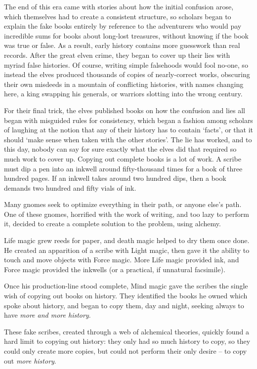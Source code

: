 \begin{multicols}{2}
\begin{exampletext}
    The end of this era came with stories about how the initial confusion arose, which themselves had to create a consistent structure, so scholars began to explain the fake books entirely by reference to the adventurers who would pay incredible sums for books about long-lost treasures, without knowing if the book was true or false.
    As a result, early history contains more guesswork than real records.
  \or
    After the great elven crime, they began to cover up their lies with myriad false histories.
    Of course, writing simple falsehoods would fool no-one, so instead the elves produced thousands of copies of nearly-correct works, obscuring their own misdeeds in a mountain of conflicting histories, with names changing here, a king swapping his generals, or warriors slotting into the wrong century.

    For their final trick, the elves published books on how the confusion and lies all began with misguided rules for consistency, which began a fashion among scholars of laughing at the notion that any of their history has to contain `facts', or that it should `make sense when taken with the other stories'.
    The lie has worked, and to this day, nobody can say for sure exactly what the elves did that required so much work to cover up.
  \or
  Copying out complete books is a lot of work.
  A scribe must dip a pen into an inkwell around fifty-thousand times for a book of three hundred pages.
  If an inkwell takes around two hundred dips, then a book demands two hundred and fifty vials of ink.

  Many gnomes seek to optimize everything in their path, or anyone else's path.
  One of these gnomes, horrified with the work of writing, and too lazy to perform it, decided to create a complete solution to the problem, using alchemy.

  Life magic grew reeds for paper, and death magic helped to dry them once done.
  He created an apparition of a scribe with Light magic, then gave it the ability to touch and move objects with Force magic.
  More Life magic provided ink, and Force magic provided the inkwells (or a practical, if unnatural facsimile).

  Once his production-line stood complete, Mind magic gave the scribes the single wish of copying out books on history.
  They identified the books he owned which spoke about history, and began to copy them, day and night, seeking always to have \emph{more and more history}.

  These fake scribes, created through a web of alchemical theories, quickly found a hard limit to copying out history: they only had so much history to copy, so they could only create more copies, but could not perform their only desire -- to copy out \emph{more history}.


\end{exampletext}
\end{multicols}
